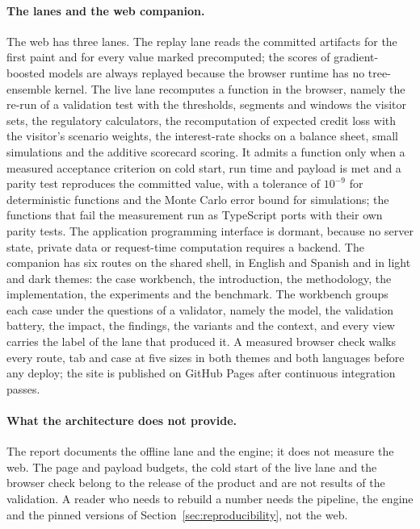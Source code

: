 \paragraph{The lanes and the web companion.} The web has three lanes. The replay lane reads the committed artifacts for the first paint and for every value marked precomputed; the scores of gradient-boosted models are always replayed because the browser runtime has no tree-ensemble kernel. The live lane recomputes a function in the browser, namely the re-run of a
validation test with the thresholds, segments and windows the visitor sets, the regulatory calculators, the recomputation of expected credit loss with the visitor's scenario weights, the interest-rate shocks on a balance sheet, small simulations and the additive scorecard scoring. It admits a function only when a measured acceptance criterion on cold start, run time and payload is met and a parity test reproduces the committed
value, with a tolerance of $10^{-9}$ for deterministic functions and the Monte Carlo error bound for simulations; the functions that fail the measurement run as TypeScript ports with their own parity tests. The application programming interface is dormant, because no server state, private data or request-time computation requires a backend. The companion has six routes on the shared shell, in English and Spanish and in light and dark themes: the case workbench, the introduction, the methodology, the implementation, the experiments and the benchmark. The workbench groups each case
under the questions of a validator, namely the model, the validation battery, the impact, the findings, the variants and the context, and every view carries the label of the lane that produced it. A measured browser check walks every route, tab and case at five sizes in both themes and both languages before any deploy; the site is published on GitHub Pages after continuous integration passes.

\paragraph{What the architecture does not provide.} The report documents the offline lane and the engine; it does not measure the web. The page and payload budgets, the cold start of the live lane and the browser check belong to the release of the product and are not results of the validation. A reader who needs to rebuild a number needs the pipeline, the engine and the pinned versions of Section~\ref{sec:reproducibility}, not the web.
